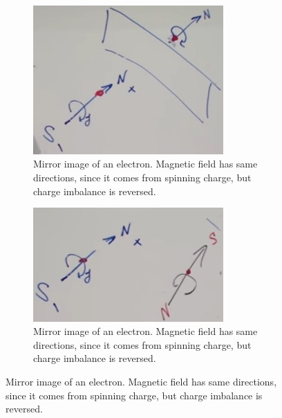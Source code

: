 \documentclass[]{article}
\begin{document}
\begin{figure}[H]
	\caption{Symmetries and dipoles}
	\begin{subfigure}[t]{0.45\textwidth}
		\caption[Mirror image of an electron]{Mirror image of an electron. Magnetic field has same directions, since it comes from spinning charge, but charge imbalance is reversed.}\label{fig:aqm-8-mirror-image}
		\begin{center}
			\includegraphics[width=0.8\textwidth]{aqm-8-mirror-image}
		\end{center}
	\end{subfigure}
	\enspace
	\begin{subfigure}[t]{0.45\textwidth}
		\caption[Mirror image of an electron]{Mirror image of an electron. Magnetic field has same directions, since it comes from spinning charge, but charge imbalance is reversed.}\label{fig:aqm-8-time-reversal}
		\begin{center}
			\includegraphics[width=0.8\textwidth]{aqm-8-time-reversal}
		\end{center}
	\end{subfigure}
\end{figure}
\end{document}

